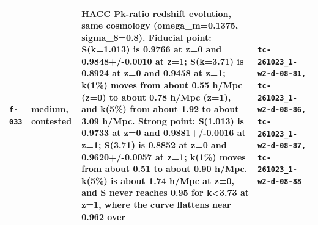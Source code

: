 \documentclass[11pt,a4paper]{article}
\begin{document}
\begin{longtable}{@{}p{}p{}p{}p{}@{}}
\texttt{f-033} & medium, \textbf{contested} & HACC Pk-ratio redshift evolution, same cosmology (omega\_m=0.1375, sigma\_8=0.8). Fiducial point: S(k=1.013) is 0.9766 at z=0 and 0.9848+/-0.0010 at z=1; S(k=3.71) is 0.8924 at z=0 and 0.9458 at z=1; k(1\%) moves from about 0.55 h/Mpc (z=0) to about 0.78 h/Mpc (z=1), and k(5\%) from about 1.92 to about 3.09 h/Mpc. Strong point: S(1.013) is 0.9733 at z=0 and 0.9881+/-0.0016 at z=1; S(3.71) is 0.8852 at z=0 and 0.9620+/-0.0057 at z=1; k(1\%) moves from about 0.51 to about 0.90 h/Mpc. k(5\%) is about 1.74 h/Mpc at z=0, and S never reaches 0.95 for k\textless{}3.73 at z=1, where the curve flattens near 0.962 over & \texttt{tc-261023\_\allowbreak{}1-w2-d-08-81,\allowbreak{} tc-261023\_\allowbreak{}1-w2-d-08-86,\allowbreak{} tc-261023\_\allowbreak{}1-w2-d-08-87,\allowbreak{} tc-261023\_\allowbreak{}1-w2-d-08-88} \\
\bottomrule\end{longtable}
\end{document}
